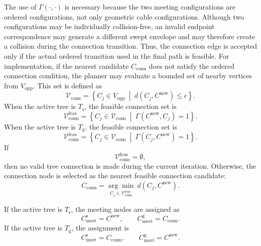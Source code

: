 \documentclass{pas}
\begin{document}
The use of \(\Gamma(\cdot,\cdot)\) is necessary because the two meeting
configurations are ordered configurations, not only geometric cable configurations.
Although two configurations may be individually collision-free, an invalid
endpoint correspondence may generate a different swept envelope and may
therefore create a collision during the connection transition. Thus, the
connection edge is accepted only if the actual ordered transition used in the
final path is feasible.
For implementation, if the nearest candidate \(C_{\mathrm{conn}}\) does not
satisfy the ordered connection condition, the planner may evaluate a bounded
set of nearby vertices from \(V_{\mathrm{opp}}\). This set is defined as
\begin{equation}
\mathcal{V}_{\mathrm{conn}}
=
\left\{
C_j\in V_{\mathrm{opp}}
\ \middle|\
d(C_j,C^{\mathrm{new}})\leq\epsilon
\right\}.
\label{eq:gcr_connection_candidate_set}
\end{equation}
When the active tree is \(T_{\mathrm{s}}\), the feasible connection set is
\begin{equation}
\mathcal{V}_{\mathrm{conn}}^{\mathrm{feas}}
=
\left\{
C_j\in \mathcal{V}_{\mathrm{conn}}
\ \middle|\
\Gamma(C^{\mathrm{new}},C_j)=1
\right\}.
\label{eq:gcr_feasible_connection_set_start_active}
\end{equation}
When the active tree is \(T_{\mathrm{g}}\), the feasible connection set is
\begin{equation}
\mathcal{V}_{\mathrm{conn}}^{\mathrm{feas}}
=
\left\{
C_j\in \mathcal{V}_{\mathrm{conn}}
\ \middle|\
\Gamma(C_j,C^{\mathrm{new}})=1
\right\}.
\label{eq:gcr_feasible_connection_set_goal_active}
\end{equation}
If
\begin{equation}
\mathcal{V}_{\mathrm{conn}}^{\mathrm{feas}}=\emptyset,
\end{equation}
then no valid tree connection is made during the current iteration. Otherwise,
the connection node is selected as the nearest feasible connection candidate:
\begin{equation}
C_{\mathrm{conn}}
=
\underset{C_j\in \mathcal{V}_{\mathrm{conn}}^{\mathrm{feas}}}{\arg\min} \
d(C_j,C^{\mathrm{new}}).
\label{eq:gcr_selected_feasible_connection}
\end{equation}

If the active tree is \(T_{\mathrm{s}}\), the meeting nodes are assigned as
\begin{equation}
C_{\mathrm{meet}}^{\mathrm{s}}
=
C^{\mathrm{new}},
\qquad
C_{\mathrm{meet}}^{\mathrm{g}}
=
C_{\mathrm{conn}}.
\label{eq:gcr_meeting_nodes_start_active}
\end{equation}
If the active tree is \(T_{\mathrm{g}}\), the assignment is
\begin{equation}
C_{\mathrm{meet}}^{\mathrm{s}}
=
C_{\mathrm{conn}},
\qquad
C_{\mathrm{meet}}^{\mathrm{g}}
=
C^{\mathrm{new}}.
\label{eq:gcr_meeting_nodes_goal_active}
\end{equation}
\end{document}
